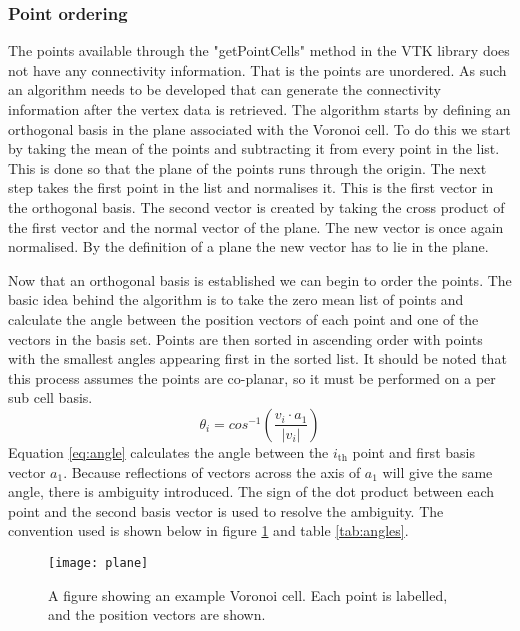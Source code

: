 \subsubsection*{Point ordering}
The points available through the "getPointCells" method in the VTK library does not have any connectivity information. That is the points are unordered. As such an algorithm needs to be developed that can generate the connectivity information after the vertex data is retrieved. The algorithm starts by defining an orthogonal basis in the plane associated with the Voronoi cell. To do this we start by taking the mean of the points and subtracting it from every point in the list. This is done so that the plane of the points runs through the origin. The next step takes the first point in the list and normalises it. This is the first vector in the orthogonal basis. The second vector is created by taking the cross product of the first vector and the normal vector of the plane. The new vector is once again normalised. By the definition of a plane the new vector has to lie in the plane. \par
Now that an orthogonal basis is established we can begin to order the points. The basic idea behind the algorithm is to take the zero mean list of points and calculate the angle between the position vectors of each point and one of the vectors in the basis set. Points are then sorted in ascending order with points with the smallest angles appearing first in the sorted list. It should be noted that this process assumes the points are co-planar, so it must be performed on a per sub cell basis. 
\begin{equation}
    \theta_i = cos^{-1}(\frac{v_i\cdot a_1}{|v_i|})
    \label{eq:angle}
\end{equation}
Equation \ref{eq:angle} calculates the angle between the $i_{\text{th}}$ point and first basis vector $a_1$. Because reflections of vectors across the axis of $a_1$ will give the same angle, there is ambiguity introduced. The sign of the dot product between each point and the second basis vector is used to resolve the ambiguity. The convention used is shown below in figure \ref{fig:planeVoro} and table \ref{tab:angles}.

\begin{figure}[h]
    \centering
    \texttt{[image: plane]}
    \caption{A figure showing an example Voronoi cell. Each point is labelled, and the position vectors are shown.}
    \label{fig:planeVoro}
\end{figure}

